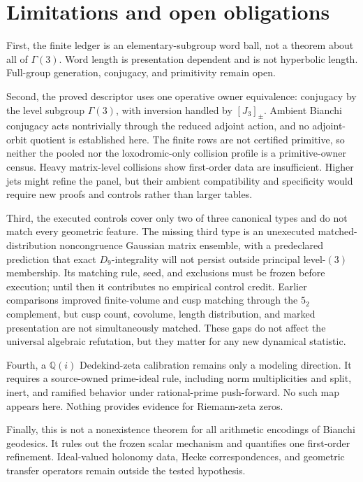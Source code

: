 \documentclass[11pt,a4paper]{article}
\theoremstyle{definition}
\theoremstyle{remark}
\begin{document}
\section{Limitations and open obligations}

First, the finite ledger is an elementary-subgroup word ball, not a theorem about all of \(\Gamma(3)\). Word length is presentation dependent and is not hyperbolic length. Full-group generation, conjugacy, and primitivity remain open.

Second, the proved descriptor uses one operative owner equivalence: conjugacy by the level subgroup \(\Gamma(3)\), with inversion handled by \([J_3]_{\pm}\). Ambient Bianchi conjugacy acts nontrivially through the reduced adjoint action, and no adjoint-orbit quotient is established here. The finite rows are not certified primitive, so neither the pooled nor the loxodromic-only collision profile is a primitive-owner census. Heavy matrix-level collisions show first-order data are insufficient. Higher jets might refine the panel, but their ambient compatibility and specificity would require new proofs and controls rather than larger tables.

Third, the executed controls cover only two of three canonical types and do not match every geometric feature. The missing third type is an unexecuted matched-distribution noncongruence Gaussian matrix ensemble, with a predeclared prediction that exact \(D_9\)-integrality will not persist outside principal level-\((3)\) membership. Its matching rule, seed, and exclusions must be frozen before execution; until then it contributes no empirical control credit. Earlier comparisons improved finite-volume and cusp matching through the \(5_2\) complement, but cusp count, covolume, length distribution, and marked presentation are not simultaneously matched. These gaps do not affect the universal algebraic refutation, but they matter for any new dynamical statistic.

Fourth, a \(\mathbb Q(i)\) Dedekind-zeta calibration remains only a modeling direction. It requires a source-owned prime-ideal rule, including norm multiplicities and split, inert, and ramified behavior under rational-prime push-forward. No such map appears here. Nothing provides evidence for Riemann-zeta zeros.

Finally, this is not a nonexistence theorem for all arithmetic encodings of Bianchi geodesics. It rules out the frozen scalar mechanism and quantifies one first-order refinement. Ideal-valued holonomy data, Hecke correspondences, and geometric transfer operators remain outside the tested hypothesis.
\end{document}
